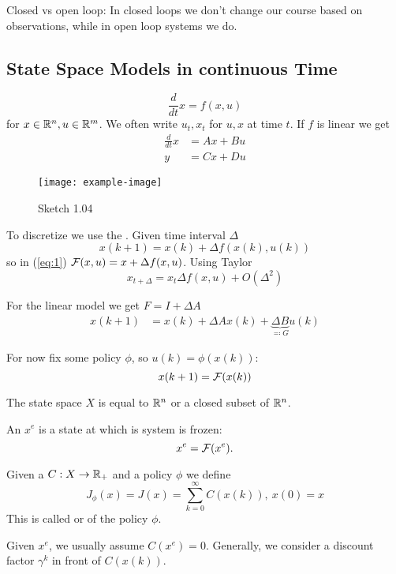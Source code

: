 Closed vs open loop: In closed loops we don't change our course based on observations, while in open loop systems we do.

\subsection{State Space Models in continuous Time}

\[\frac{d}{dt}x=f(x,u)\]
for \(x\in \mathbb{R}^n, u\in \mathbb{R}^m\). We often write \(u_t,x_t\) for \(u,x\) at time \(t\).
If \(f\) is linear we get
\begin{align*}
    \frac{d}{dt}x&=Ax+Bu\\
    y&=Cx+Du
\end{align*}

\begin{figure}[H]\label{fig:1.04}
    \centering
    \texttt{[image: example-image]}
    \caption{Sketch 1.04}
\end{figure}

To discretize we use the . Given time interval \(\Delta\)
\[x(k+1)=x(k)+\Delta f(x(k),u(k))\]
so in (\ref{eq:1}) \(\mathcal{F}(x,u)=x+\Delta f(x,u)\).
Using Taylor
\[x_{t+ \Delta}=x_t \Delta f(x,u)+O(\Delta^2)\]

For the linear model we get 
\(F=I+\Delta A\)
\begin{align*}
    x(k+1) &= x(k)+\Delta Ax(k)+\underbrace{\Delta B}_{\eqqcolon G}u(k)
\end{align*}

For now fix some policy \(\phi\), so \(u(k)=\phi(x(k))\):
\[x(k+1)=\mathcal{F}(x(k))\]
\begin{assumption}\label{ass:1.2}
    The state space \(X\) is equal to \(\mathbb{R}^n\) or a closed subset of \(\mathbb{R}^n\).
\end{assumption}

\begin{definition}\label{def:1.3}
    An  \(x^e\) is a state at which is system is frozen:
    \[x^e=\mathcal{F}(x^e).\]
\end{definition}


\begin{definition}\label{def:1.4}
    Given a  \(C:X\to \mathbb{R}_+\) and a 
    policy \(\phi\) we define 
    \[J_\phi(x)=J(x)=\sum_{k=0}^\infty C(x(k)),\ x(0)=x\] 
    This is called  or  of the policy \(\phi\).
\end{definition}
Given \(x^e\), we usually assume \(C(x^e)=0\). Generally, we consider a discount factor \(\gamma^k\) in front of \(C(x(k))\).

